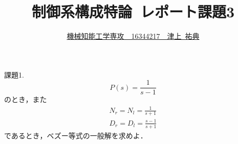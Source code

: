 \documentclass[a4paper,12pt]{jarticle}
\begin{document}
%
\title{\vspace{-30mm} 制御系構成特論~レポート課題3}
\author{\underline{機械知能工学専攻~~16344217~~津上~祐典}}
\date{}
%
\maketitle
%
\vspace{-25mm}
%

\begin{itembox}[l]{\Large{課題1.}}
%
 \begin{equation}
P(s)=\frac{1}{s-1}
 \end{equation}
%
 のとき，また
%
\begin{eqnarray}
 N_r=N_l=\frac{1}{s+1} \\
 D_r=D_l=\frac{s-1}{s+1}
\end{eqnarray}
%
であるとき，ベズー等式の一般解を求めよ．
\end{itembox}

\vspace{-10mm}
\end{document}
